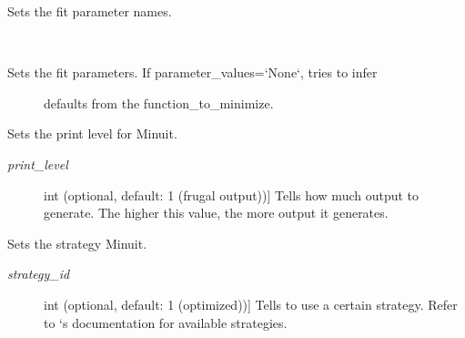 \documentclass[a4paper,10pt,english]{sphinxmanual}
\begin{document}
\begin{fulllineitems}
\begin{fulllineitems}
\end{fulllineitems}


\begin{fulllineitems}
\label{module_doc:kafe.iminuit_wrapper.IMinuit.set_parameter_names}
Sets the fit parameter names.

\end{fulllineitems}


\begin{fulllineitems}
\label{module_doc:kafe.iminuit_wrapper.IMinuit.set_parameter_values}~\begin{description}
\item[{Sets the fit parameters. If parameter\_values={}`None{}`, tries to infer}] \leavevmode
defaults from the function\_to\_minimize.

\end{description}

\end{fulllineitems}


\begin{fulllineitems}
\label{module_doc:kafe.iminuit_wrapper.IMinuit.set_print_level}
Sets the print level for Minuit.
\begin{description}
\item[{\emph{print\_level}}] \leavevmode{[}int (optional, default: 1 (frugal output)){]}
Tells  how much output to generate. The higher this
value, the more output it generates.

\end{description}

\end{fulllineitems}


\begin{fulllineitems}
\label{module_doc:kafe.iminuit_wrapper.IMinuit.set_strategy}
Sets the strategy Minuit.
\begin{description}
\item[{\emph{strategy\_id}}] \leavevmode{[}int (optional, default: 1 (optimized)){]}
Tells  to use a certain strategy. Refer to `s
documentation for available strategies.


\end{description}
\end{fulllineitems}
\end{fulllineitems}
\end{document}
